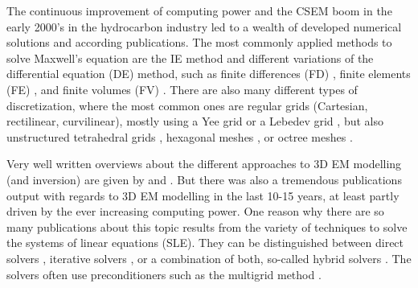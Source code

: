 \documentclass[extra, camera,%
]{gji}
\begin{document}
The continuous improvement of computing power and the CSEM boom in the early 2000's in the hydrocarbon industry led to a wealth of developed numerical solutions and according publications. The most commonly applied methods to solve Maxwell's equation are the IE method \citep{GJI.74.Raiche, RS.02.Hursan, GEO.06.Zhdanov, GP.10.Tehrani, CAG.16.Kruglyakov, MGS.17.Kruglyakov} and different variations of the differential equation (DE) method, such as finite differences (FD) \citep{GEO.93.Wang, RS.94.Druskin, RSC.94.Mackie, GEO.09.Streich, CAG.13.Sommer}, finite elements (FE) \citep{GEO.04.Commer, GJI.11.Schwarzbach,GEO.12.daSilva, GJI.13.Grayver, GJI.13.Puzyrev, SEG.16.Zhang}, and finite volumes (FV) \citep{EM.90.Madsen, SIAM.01.Haber, PIER.01.Clemens, GEO.14.Jahandari}. There are also many different types of discretization, where the most common ones are regular grids (Cartesian, rectilinear, curvilinear), mostly using a Yee grid \citep{IEEE.66.Yee} or a Lebedev grid \citep{CMMP.64.Lebedev}, but also unstructured tetrahedral grids \citep{SEG.16.Zhang, CAG.17.Cai}, hexagonal meshes \citep{CAG.14.Cai}, or octree meshes \citep{ECP.07.Haber}.

Very well written overviews about the different approaches to 3D EM modelling (and inversion) are given by \cite{SG.05.Avdeev} and \cite{SG.10.Borner}. But there was also a tremendous publications output with regards to 3D EM modelling in the last 10-15 years, at least partly driven by the ever increasing computing power. One reason why there are so many publications about this topic results from the variety of techniques to solve the systems of linear equations (SLE). They can be distinguished between direct solvers \citep{GEO.09.Streich, GP.14.Chung, GEO.14.Jaysaval, GEO.15.Grayver, SEG.15.Oh, GJI.18.Wang}, iterative solvers \citep{GP.06.Mulder, GJI.15.Jaysaval}, or a combination of both, so-called hybrid solvers \citep{GEO.18.Liu}. The solvers often use preconditioners such as the multigrid method \citep{SIAM.02.Aruliah, GJI.16.Jaysaval}.
\end{document}
